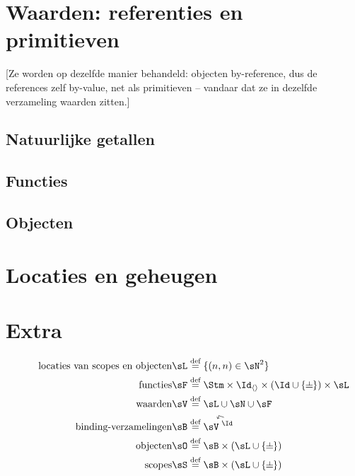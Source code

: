 \section{Waarden: referenties en primitieven}

[Ze worden op dezelfde manier behandeld: objecten by-reference, dus de references zelf by-value, net als primitieven -- vandaar dat ze in dezelfde verzameling waarden zitten.]

\subsection{Natuurlijke getallen}

\subsection{Functies}

\subsection{Objecten}

\section{Locaties en geheugen}\label{sec:locaties}

\section*{Extra}

\begin{align*}
  \tag*{locaties van scopes en objecten}
  \sL &\DEF \{ (n, n) \in \sN^2 \} \\
  \tag*{functies}
  \sF &\DEF \Stm \times \Id_{\langle\rangle} \times (\Id \cup \{\nil\}) \times \sL \\
  \tag*{waarden}
  \sV &\DEF \sL \cup \sN \cup \sF \\
  \tag*{binding-verzamelingen}
  \sB &\DEF \FiniteFunctions{\sV}{\Id} \\
  \tag*{objecten}
  \sO &\DEF \sB \times (\sL \cup \{\nil\}) \\
  \tag*{scopes}
  \sS &\DEF \sB \times (\sL \cup \{\nil\}) \\
\end{align*}

